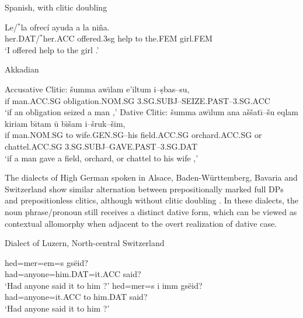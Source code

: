 \begin{exe}
\ex Spanish, with clitic doubling
\begin{xlist}
\ex \gll Le/$^{*}$la ofrecí ayuda a la niña.\\
her.DAT/$^{*}$her.ACC offered.3sg help to the.FEM girl.FEM\\
\trans `I offered help to the girl \citep[ex. 5a]{Suner.1988}.'
\end{xlist}
\ex Akkadian
\begin{xlist}
\ex Accusative Clitic:
\gll \v{s}umma aw\={\i}lam e'iltum i--\d{s}bas--su,\\
if man.ACC.SG obligation.NOM.SG 3.SG.SUBJ--SEIZE.PAST--3.SG.ACC\\
\trans `if an obligation seized a man \citep[pg. 171]{Huehnergard.1997},'
\ex Dative Clitic:
\gll \v{s}umma aw\={\i}lum ana a\v{s}\v{s}at\={\i}--\v{s}u eqlam kiriam b\={\i}tam \={u} b\={\i}\v{s}am i--\v{s}ruk--\v{s}im,\\
if man.NOM.SG to wife.GEN.SG--his field.ACC.SG orchard.ACC.SG or chattel.ACC.SG 3.SG.SUBJ--GAVE.PAST--3.SG.DAT\\
\trans `if a man gave a field, orchard, or chattel to his wife \citep[pg. 171]{Huehnergard.1997},'
\end{xlist}
\end{exe}

The dialects of High German spoken in Alsace, Baden-Württemberg, Bavaria and Switzerland show similar alternation between prepositionally marked full DPs and prepositionless clitics, although without clitic doubling \citep{Seiler.2003}. In these dialects, the noun phrase/pronoun still receives a distinct dative form, which can be viewed as contextual allomorphy when adjacent to the overt realization of dative case.

\begin{exe}
\ex Dialect of Luzern, North-central Switzerland
\begin{xlist}
\ex \gll hed=mer=em=s gsëid?\\
had=anyone=him.DAT=it.ACC said?\\
\trans `Had anyone said it to him \citep[pg. 161]{Seiler.2003}?'
\ex \gll hed=mer=s i imm gsëid?\\
had=anyone=it.ACC to him.DAT said?\\
\trans `Had anyone said it to him \citep[pg. 161]{Seiler.2003}?'
\end{xlist}
\end{exe}

